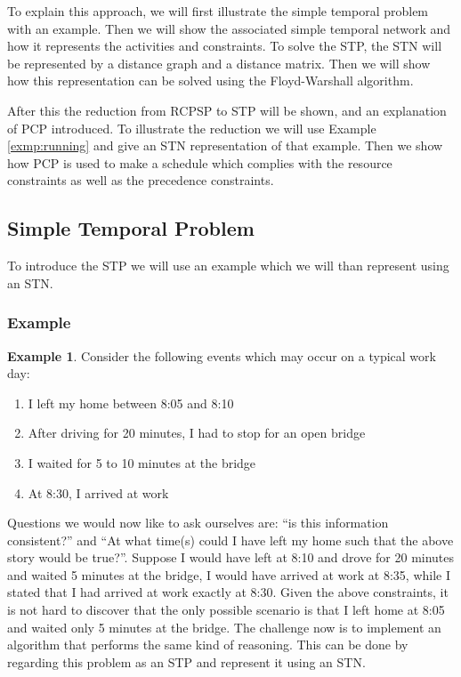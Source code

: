 \documentclass{article}
\theoremstyle{definition}
\newtheorem{example}{Example}[section]
\begin{document}
To explain this approach, we will first illustrate the simple temporal problem with an example.
Then we will show the associated simple temporal network and how it represents the activities and constraints.
To solve the STP, the STN will be represented by a distance graph and a distance matrix.
Then we will show how this representation can be solved using the Floyd-Warshall algorithm.

After this the reduction from RCPSP to STP will be shown, and an explanation of PCP introduced.
To illustrate the reduction we will use Example \ref{exmp:running} and give an STN representation of that example.
Then we show how PCP is used to make a schedule which complies with the resource constraints as well as the precedence constraints.

\subsection{Simple Temporal Problem}
\label{text:STN}
To introduce the STP we will use an example which we will than represent using an STN.

\subsubsection{Example}
\begin{example}
\label{exmp:stn}
Consider the following events which may occur on a typical work day:
\begin{enumerate}
\item I left my home between 8:05 and 8:10
\item After driving for 20 minutes, I had to stop for an open bridge
\item I waited for 5 to 10 minutes at the bridge
\item At 8:30, I arrived at work 
\end{enumerate}
\end{example}

Questions we would now like to ask ourselves are: ``is this information consistent?'' and ``At what time(s) could I have left my home such that the above story would be true?''. 
Suppose I would have left at 8:10 and drove for 20 minutes and waited 5 minutes at the bridge, I would have arrived at work at 8:35, while I stated that I had arrived at work exactly at 8:30. 
Given the above constraints, it is not hard to discover that the only possible scenario is that I left home at 8:05 and waited only 5 minutes at the bridge.
The challenge now is to implement an algorithm that performs the same kind of reasoning. 
This can be done by regarding this problem as an STP and represent it using an STN.
\end{document}
